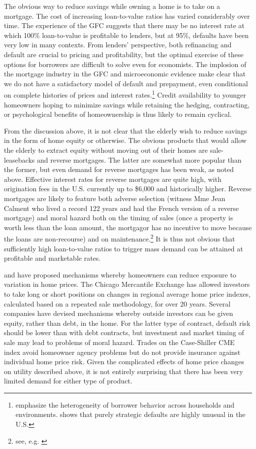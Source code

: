 \documentclass[12pt]{article}
\begin{document}
The obvious way to reduce savings while owning a home is to take on a mortgage.
The cost of increasing loan-to-value ratios has varied considerably over time.
The experience of the GFC suggests that there may be no interest rate at which 100\%
loan-to-value is profitable to lenders, but at 95\%, defaults have been very
low in many contexts.  From lenders' perspective, both refinancing and default
are crucial to pricing and profitability, but the optimal exercise of these
options for borrowers are difficult to solve even for economists.  The
implosion of the mortgage industry in the GFC and microeconomic evidence make
clear that we do not have a satisfactory model of default and prepayment, even
conditional on complete histories of prices and interest
rates.\footnote{\textcite{DengQuigleyVanOrder} emphasize the heterogeneity of
borrower behavior across households and environments. \textcite{lowDefault}
shows that purely strategic defaults are highly unusual in the U.S.}  Credit
availability to younger homeowners hoping to minimize savings while retaining
the hedging, contracting, or psychological benefits of homeownership is thus
likely to remain cyclical.

From the discussion above, it is not clear that the elderly wish to reduce
savings in the form of home equity or otherwise.  The obvious products that
would allow the elderly to extract equity without moving out of their homes are
sale-leasebacks and reverse mortgages.  The latter are somewhat more popular
than the former, but even demand for reverse mortgages has been weak, as noted
above. Effective interest rates for reverse mortgages are quite high, with
origination fees in the U.S. currently up to \$6,000 and historically higher.
Reverse mortgages are likely to feature both adverse selection (witness Mme
Jean Calment who lived a record 122 years and had the French version of a
reverse mortgage) and moral hazard both on the timing of sales (once a property
is worth less than the loan amount, the mortgagor has no incentive to move
because the loans are non-recourse) and on maintenance.\footnote{see, e.g.
\textcite{MiceliSirmans}} It is thus not obvious that sufficiently high
loan-to-value ratios to trigger mass demand can be attained at profitable and
marketable rates.

\textcite{Shiller} and \textcite{CaplinChanFreemanTracy} have proposed mechanisms
whereby homeowners can reduce exposure to variation in home prices.  The Chicago
Mercantile Exchange has allowed investors to take long or short positions on
changes in regional average home price indexes, calculated based on a repeated
sale methodology, for over 20 years.  Several companies have devised mechanisms
whereby outside investors can be given equity, rather than debt, in the home.
For the latter type of contract, default risk should be lower than with debt
contracts, but investment and market timing of sale may lead to problems of
moral hazard.  Trades on the Case-Shiller CME index avoid homeowner agency
problems but do not provide insurance against individual home price risk.
Given the complicated effects of home price changes on utility described above,
it is not entirely surprising that there has been very limited demand for
either type of product.
\end{document}

